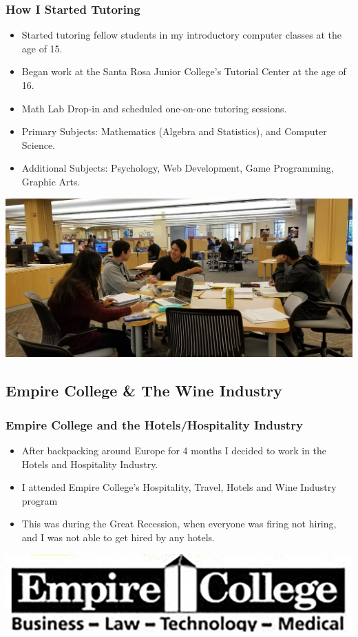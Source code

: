 \documentclass{beamer}
\begin{document}
\begin{frame}
	\frametitle{How I Started Tutoring}
	\begin{itemize}
		\item Started tutoring fellow students in my introductory computer classes at the age of 15.  
		\item Began work at the Santa Rosa Junior College's Tutorial Center at the age of 16.
		\item Math Lab Drop-in and scheduled one-on-one tutoring sessions.  
		\item Primary Subjects:  Mathematics (Algebra and Statistics), and Computer Science.
		\item Additional Subjects:  Psychology, Web Development, Game Programming, Graphic Arts.
	\end{itemize}
	\begin{center}
		\includegraphics[width = 1.0\textwidth]{images/SRJC Tutorial Center.PNG}
	\end{center}
\end{frame}
		
\subsection{Empire College \& The Wine Industry}
	\begin{frame}
	\frametitle{Empire College and the Hotels/Hospitality Industry}
	\begin{itemize}
		\item After backpacking around Europe for 4 months I decided to work in the Hotels and Hospitality Industry.
\item I attended Empire College's Hospitality, Travel, Hotels and Wine Industry program
\item This was during the Great Recession, when everyone was firing not hiring, and I was not able to get hired by any hotels.
\end{itemize}
\begin{center}
	\includegraphics[width = 1.0\textwidth]{images/Empire College.png}
\end{center}
\end{frame}
\end{document}

